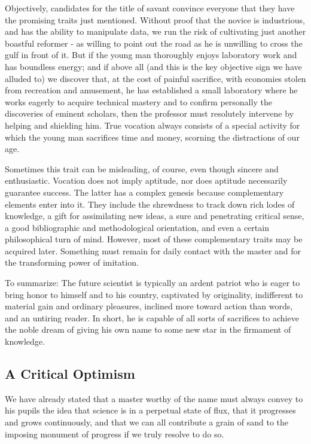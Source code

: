 \documentclass{article}
\begin{document}
Objectively, candidates for the title of savant convince everyone that they have the promising traits just mentioned. Without proof that the novice is industrious, and has the ability to manipulate data, we run the risk of cultivating just another boastful reformer - as willing to point out the road as he is unwilling to cross the gulf in front of it. But if the young man thoroughly enjoys laboratory work and has boundless energy; and if above all (and this is the key objective sign we have alluded to) we discover that, at the cost of painful sacrifice, with economies stolen from recreation and amusement, he has established a small laboratory where he works eagerly to acquire technical mastery and to confirm personally the discoveries of eminent scholars, then the professor must resolutely intervene by helping and shielding him. True vocation always consists of a special activity for which the young man sacrifices time and money, scorning the distractions of our age.

Sometimes this trait can be misleading, of course, even though sincere and enthusiastic. Vocation does not imply aptitude, nor does aptitude necessarily guarantee success. The latter has a complex genesis because complementary elements enter into it. They include the shrewdness to track down rich lodes of knowledge, a gift for assimilating new ideas, a sure and penetrating critical sense, a good bibliographic and methodological orientation, and even a certain philosophical turn of mind. However, most of these complementary traits may be acquired later. Something must remain for daily contact with the master and for the transforming power of imitation.

To summarize: The future scientist is typically an ardent patriot who is eager to bring honor to himself and to his country, captivated by originality, indifferent to material gain and ordinary pleasures, inclined more toward action than words, and an untiring reader. In short, he is capable of all sorts of sacrifices to achieve the noble dream of giving his own name to some new star in the firmament of knowledge.

\subsection*{A Critical Optimism}

We have already stated that a master worthy of the name must always convey to his pupils the idea that science is in a perpetual state of flux, that it progresses and grows continuously, and that we can all contribute a grain of sand to the imposing monument of progress if we truly resolve to do so.
\end{document}
